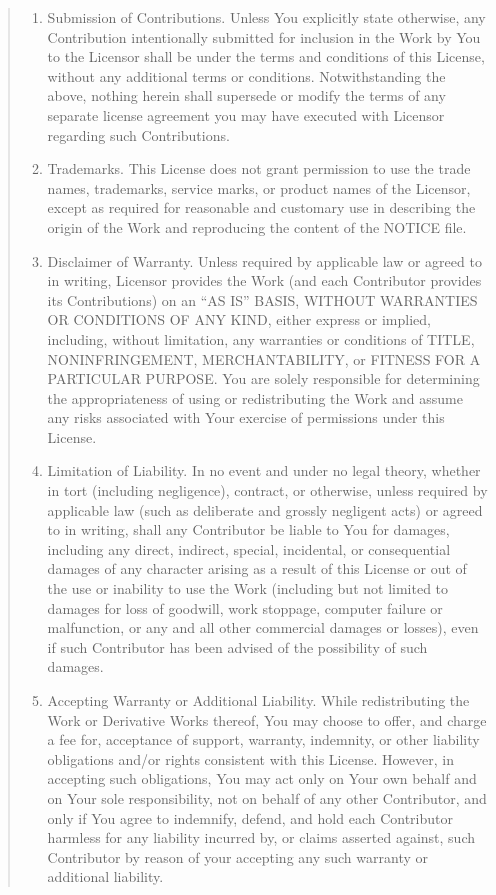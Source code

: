 \documentclass[letterpaper,10pt,english,openany,oneside]{sphinxmanual}
\begin{document}
\begin{quote}
\begin{enumerate}
\item {} 
Submission of Contributions. Unless You explicitly state otherwise,
any Contribution intentionally submitted for inclusion in the Work
by You to the Licensor shall be under the terms and conditions of
this License, without any additional terms or conditions.
Notwithstanding the above, nothing herein shall supersede or modify
the terms of any separate license agreement you may have executed
with Licensor regarding such Contributions.

\item {} 
Trademarks. This License does not grant permission to use the trade
names, trademarks, service marks, or product names of the Licensor,
except as required for reasonable and customary use in describing the
origin of the Work and reproducing the content of the NOTICE file.

\item {} 
Disclaimer of Warranty. Unless required by applicable law or
agreed to in writing, Licensor provides the Work (and each
Contributor provides its Contributions) on an “AS IS” BASIS,
WITHOUT WARRANTIES OR CONDITIONS OF ANY KIND, either express or
implied, including, without limitation, any warranties or conditions
of TITLE, NON\sphinxhyphen{}INFRINGEMENT, MERCHANTABILITY, or FITNESS FOR A
PARTICULAR PURPOSE. You are solely responsible for determining the
appropriateness of using or redistributing the Work and assume any
risks associated with Your exercise of permissions under this License.

\item {} 
Limitation of Liability. In no event and under no legal theory,
whether in tort (including negligence), contract, or otherwise,
unless required by applicable law (such as deliberate and grossly
negligent acts) or agreed to in writing, shall any Contributor be
liable to You for damages, including any direct, indirect, special,
incidental, or consequential damages of any character arising as a
result of this License or out of the use or inability to use the
Work (including but not limited to damages for loss of goodwill,
work stoppage, computer failure or malfunction, or any and all
other commercial damages or losses), even if such Contributor
has been advised of the possibility of such damages.

\item {} 
Accepting Warranty or Additional Liability. While redistributing
the Work or Derivative Works thereof, You may choose to offer,
and charge a fee for, acceptance of support, warranty, indemnity,
or other liability obligations and/or rights consistent with this
License. However, in accepting such obligations, You may act only
on Your own behalf and on Your sole responsibility, not on behalf
of any other Contributor, and only if You agree to indemnify,
defend, and hold each Contributor harmless for any liability
incurred by, or claims asserted against, such Contributor by reason
of your accepting any such warranty or additional liability.


\end{enumerate}
\end{quote}
\end{document}
